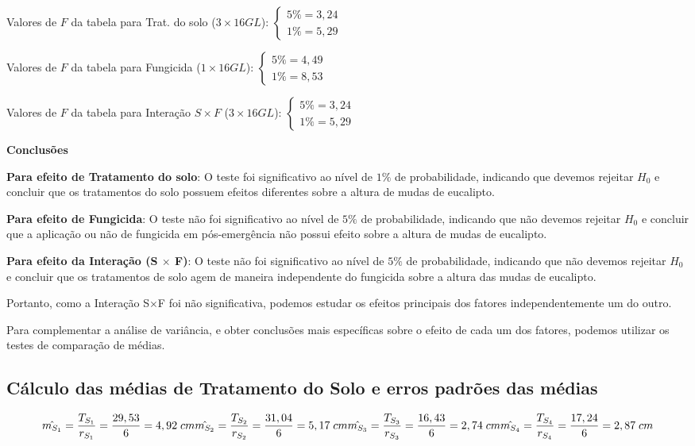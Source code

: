 \documentclass[
]{article}
\begin{document}
Valores de \(F\) da tabela para Trat. do solo (\(3 \times 16 GL\)):
\(\begin{cases}5\%=3,24 \\ 1\%=5,29 \end{cases}\)

Valores de \(F\) da tabela para Fungicida (\(1 \times 16 GL\)):
\(\begin{cases}5\%=4,49 \\ 1\%=8,53 \end{cases}\)

Valores de \(F\) da tabela para Interação \(S\times F\)
(\(3 \times 16 GL\)): \(\begin{cases}5\%=3,24 \\ 1\%=5,29 \end{cases}\)

\textbf{Conclusões}

\textbf{Para efeito de Tratamento do solo}: O teste foi significativo ao
nível de \(1\%\) de probabilidade, indicando que devemos rejeitar
\(H_0\) e concluir que os tratamentos do solo possuem efeitos diferentes
sobre a altura de mudas de eucalipto.

\textbf{Para efeito de Fungicida}: O teste não foi significativo ao
nível de \(5\%\) de probabilidade, indicando que não devemos rejeitar
\(H_0\) e concluir que a aplicação ou não de fungicida em pós-emergência
não possui efeito sobre a altura de mudas de eucalipto.

\textbf{Para efeito da Interação (S \(\times\) F)}: O teste não foi
significativo ao nível de \(5\%\) de probabilidade, indicando que não
devemos rejeitar \(H_0\) e concluir que os tratamentos de solo agem de
maneira independente do fungicida sobre a altura das mudas de eucalipto.

Portanto, como a Interação S\(\times\)F foi não significativa, podemos
estudar os efeitos principais dos fatores independentemente um do outro.

Para complementar a análise de variância, e obter conclusões mais
específicas sobre o efeito de cada um dos fatores, podemos utilizar os
testes de comparação de médias.

\subsection{Cálculo das médias de Tratamento do Solo e erros padrões das
médias}\label{cuxe1lculo-das-muxe9dias-de-tratamento-do-solo-e-erros-padruxf5es-das-muxe9dias}

\[
\hat{m_{S_1}} = \frac{T_{S_1}}{r_{S_1}}=\frac{29,53}{6}=4,92\;cm \\
\hat{m_{S_2}} = \frac{T_{S_2}}{r_{S_2}}=\frac{31,04}{6}=5,17\;cm \\
\hat{m_{S_3}} = \frac{T_{S_3}}{r_{S_3}}=\frac{16,43}{6}=2,74\;cm \\
\hat{m_{S_4}} = \frac{T_{S_4}}{r_{S_4}}=\frac{17,24}{6}=2,87\;cm
\]
\end{document}
